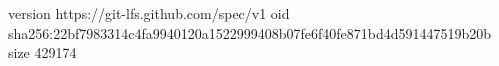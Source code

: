version https://git-lfs.github.com/spec/v1
oid sha256:22bf7983314c4fa9940120a1522999408b07fe6f40fe871bd4d591447519b20b
size 429174
